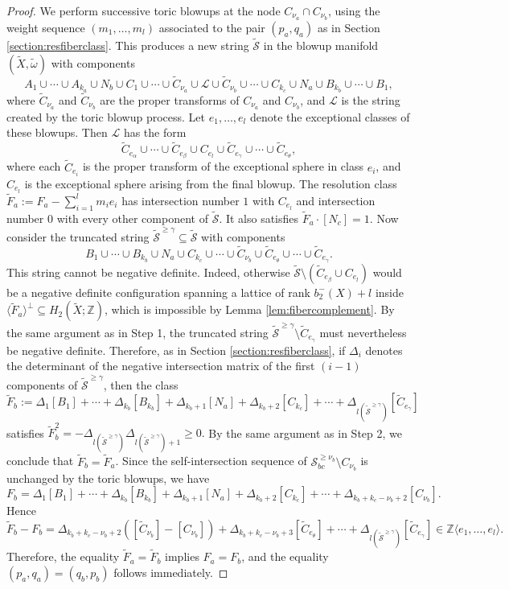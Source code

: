 \documentclass[11pt]{article}
\theoremstyle{definition}
\theoremstyle{remark}
\newcommand{\Z}{\mathbb{Z}}
\newcommand{\st}{\mathcal{S}}
\begin{document}
\begin{proof}
We perform successive toric blowups at the node $C_{\nu_a}\cap C_{\nu_b}$, using the weight sequence $(m_1,\dots,m_l)$ associated to the pair $(p_a,q_a)$ as in Section \ref{section:resfiberclass}. This produces a new string $\tilde{\st}$ in the blowup manifold $(\tilde{X},\tilde{\omega})$ with components
\[A_1\cup\cdots\cup A_{k_a}\cup N_b\cup C_1\cup\cdots\cup \tilde{C}_{\nu_a}\cup \mathcal{L}\cup\tilde{C}_{\nu_b}\cup\cdots\cup C_{k_c}\cup N_a\cup B_{k_b}\cup\cdots\cup B_1,\]
where $\tilde{C}_{\nu_a}$ and $\tilde{C}_{\nu_b}$ are the proper transforms of $C_{\nu_a}$ and $C_{\nu_b}$, and $\mathcal{L}$ is the string created by the toric blowup process. Let $e_1,\dots,e_l$ denote the exceptional classes of these blowups. Then $\mathcal{L}$ has the form
\[\tilde{C}_{e_\alpha}\cup\cdots\cup\tilde{C}_{e_\beta}\cup C_{e_l}\cup\tilde{C}_{e_\gamma}\cup\cdots\cup\tilde{C}_{e_\theta},\]
where each $\tilde{C}_{e_i}$ is the proper transform of the exceptional sphere in class $e_i$, and $C_{e_l}$ is the exceptional sphere arising from the final blowup. The resolution class
\(\tilde{F}_a:=F_a-\sum_{i=1}^l m_i e_i\)
has intersection number $1$ with $C_{e_l}$ and intersection number $0$ with every other component of $\tilde{\st}$. It also satisfies $\tilde{F}_a\cdot [N_c]=1$. Now consider the truncated string $\tilde{\st}^{\geq \gamma}\subseteq \tilde{\st}$ with components
\[B_1\cup\cdots\cup B_{k_b}\cup N_a\cup C_{k_c}\cup\cdots\cup \tilde{C}_{\nu_b}\cup \tilde{C}_{e_\theta}\cup\cdots\cup \tilde{C}_{e_\gamma}.\]
This string cannot be negative definite. Indeed, otherwise $\tilde{\st}\setminus (\tilde{C}_{e_\beta}\cup C_{e_l})$ would be a negative definite configuration spanning a lattice of rank $b_2^-(X)+l$ inside $\langle\tilde{F}_a\rangle^\perp\subseteq H_2(\tilde{X};\mathbb{Z})$, which is impossible by Lemma \ref{lem:fibercomplement}. By the same argument as in Step 1, the truncated string $\tilde{\st}^{\geq \gamma}\setminus \tilde{C}_{e_\gamma}$ must nevertheless be negative definite. Therefore, as in Section \ref{section:resfiberclass}, if $\Delta_i$ denotes the determinant of the negative intersection matrix of the first $(i-1)$ components of $\tilde{\st}^{\geq \gamma}$, then the class
\[\tilde{F}_b:=\Delta_1[B_1]+\cdots+\Delta_{k_b}[B_{k_b}]+\Delta_{k_b+1}[N_a]+\Delta_{k_b+2}[C_{k_c}]+\cdots+\Delta_{l(\tilde{\st}^{\geq \gamma})}[\tilde{C}_{e_\gamma}]\]
satisfies
\(\tilde{F}_b^2=-\Delta_{l(\tilde{\st}^{\geq \gamma})}\Delta_{l(\tilde{\st}^{\geq \gamma})+1}\geq 0.\)
By the same argument as in Step 2, we conclude that $\tilde{F}_b=\tilde{F}_a$.
Since the self-intersection sequence of $\st_{bc}^{\geq \nu_b}\setminus C_{\nu_b}$ is unchanged by the toric blowups, we have
\[F_b=\Delta_1[B_1]+\cdots+\Delta_{k_b}[B_{k_b}]+\Delta_{k_b+1}[N_a]+\Delta_{k_b+2}[C_{k_c}]+\cdots+\Delta_{k_b+k_c-\nu_b+2}[C_{\nu_b}].\]
Hence
\[\tilde{F}_b-F_b=\Delta_{k_b+k_c-\nu_b+2}([\tilde{C}_{\nu_b}]-[C_{\nu_b}]) +\Delta_{k_b+k_c-\nu_b+3}[\tilde{C}_{e_\theta}]+\cdots+\Delta_{l(\tilde{\st}^{\geq \gamma})}[\tilde{C}_{e_\gamma}]\in \Z\langle e_1,\dots,e_l\rangle.\]
Therefore, the equality $\tilde{F}_a=\tilde{F}_b$ implies $F_a=F_b$, and the equality $(p_a,q_a)=(q_b,p_b)$ follows immediately.


\end{proof}
\end{document}
